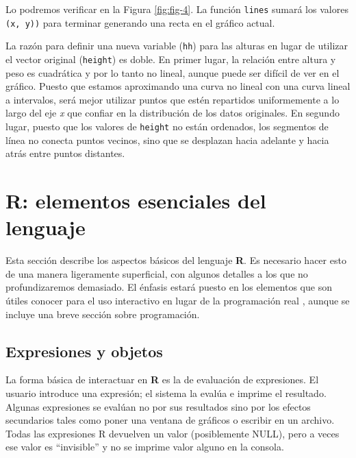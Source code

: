 Lo podremos verificar en la Figura \ref{fig:fig-4}. La función \texttt{lines}
sumará los valores \texttt{(x, y))} para terminar generando una recta en el
gráfico actual.

La razón para definir una nueva variable (\texttt{hh}) para las alturas en
lugar de utilizar el vector original (\texttt{height}) es doble. En primer
lugar, la relación entre altura y peso es cuadrática y por lo tanto no lineal,
aunque puede ser difícil de ver en el gráfico. Puesto que estamos aproximando
una curva no lineal con una curva lineal a intervalos, será mejor utilizar
puntos que estén repartidos uniformemente a lo largo del eje \textit{x} que
confiar en la distribución de los datos originales. En segundo lugar, puesto
que los valores de \texttt{height} no están ordenados, los segmentos de línea
no conecta puntos vecinos, sino que se desplazan hacia adelante y hacia atrás
entre puntos distantes.

\section{R: elementos esenciales del lenguaje}

Esta sección describe los aspectos básicos del lenguaje \textbf{R}. Es
necesario hacer esto de una manera ligeramente superficial, con algunos
detalles a los que no profundizaremos demasiado.  El énfasis estará puesto en los
elementos que son útiles conocer para el uso interactivo en lugar de la
programación real , aunque se incluye una breve sección sobre programación.

\subsection{Expresiones y objetos}

La forma básica de interactuar en \textbf{R} es la de evaluación de
expresiones. El usuario introduce una expresión; el sistema la evalúa e imprime
el resultado.  Algunas expresiones se evalúan no por sus resultados sino por
los efectos secundarios tales como poner una ventana de gráficos o escribir en
un archivo. Todas las expresiones R devuelven un valor (posiblemente NULL),
pero a veces ese valor es ``invisible''  y no se imprime valor alguno en la
consola.

